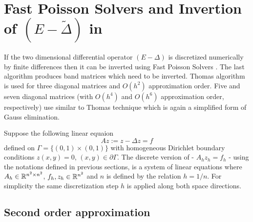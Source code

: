 \documentclass[11pt,a4paper,twoside]{article}
\begin{document}
\section{Fast Poisson Solvers and Invertion of $(E-\tilde \Delta)$ in }\label{FPSsection}

If the two dimensional differential operator $(E-\Delta)$ is discretized numerically by finite differences then it can be inverted using Fast Poisson Solvers \cite{FPS}. The last algorithm produces band matrices which need to be inverted. Thomas algorithm is used for three diagonal matrices and $O(h^2)$ approximation order.  Five and seven diagonal matrices (with $O(h^4)$ and $O(h^6)$ approximation order, respectively) use similar to Thomas technique which is again a simplified form of Gauss elimination.

Suppose the following linear equaion
\begin{equation}\label{FPeq}
Az:=z-\Delta z = f
\end{equation}
defined on $\Gamma = \{ (0,1) \times (0,1) \}$ with homogeneous Dirichlet boundary conditions $z(x,y) = 0$, $(x,y) \in \partial \Gamma$. The discrete version of  - $A_h z_h = f_h$ - using the notations defined in previous sections, is a system of linear equations where $A_h \in \mathbb{R}^{n^2 \times n^2}$, $f_h, z_h \in \mathbb{R}^{n^2}$ and $n$ is defined by the relation $h=1/n$. For simplicity the same discretization step $h$ is applied along both space directions.
\subsection{Second order approximation}
\end{document}
